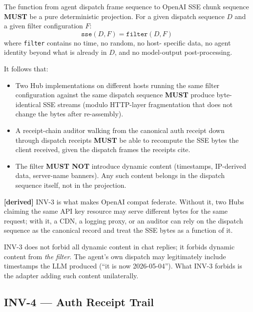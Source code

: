 \documentclass[11pt,a4paper]{article}
\newcommand{\derived}{\textcolor{derivedcolor}{\textbf{[derived]}}\xspace}
\theoremstyle{definition}
\begin{document}
\begin{invariant}
The function from agent dispatch frame sequence to OpenAI SSE
chunk sequence \textbf{MUST} be a pure deterministic projection.
For a given dispatch sequence \(D\) and a given filter
configuration \(F\):
\[
    \texttt{sse}(D, F) = \texttt{filter}(D, F)
\]
where \texttt{filter} contains no time, no random, no host-
specific data, no agent identity beyond what is already in
\(D\), and no model-output post-processing.

It follows that:
\begin{itemize}[leftmargin=2em,itemsep=0.1em]
    \item Two Hub implementations on different hosts running
    the same filter configuration against the same dispatch
    sequence \textbf{MUST} produce byte-identical SSE streams
    (modulo HTTP-layer fragmentation that does not change the
    bytes after re-assembly).
    \item A receipt-chain auditor walking from the canonical
    auth receipt down through dispatch receipts \textbf{MUST}
    be able to recompute the SSE bytes the client received,
    given the dispatch frames the receipts cite.
    \item The filter \textbf{MUST NOT} introduce dynamic content
    (timestamps, IP-derived data, server-name banners). Any such
    content belongs in the dispatch sequence itself, not in the
    projection.
\end{itemize}
\end{invariant}

\derived{} INV-3 is what makes OpenAI compat federate. Without
it, two Hubs claiming the same API key resource may serve
different bytes for the same request; with it, a CDN, a logging
proxy, or an auditor can rely on the dispatch sequence as the
canonical record and treat the SSE bytes as a function of it.

\begin{notebox}
INV-3 does not forbid all dynamic content in chat replies; it
forbids dynamic content from \emph{the filter}. The agent's own
dispatch may legitimately include timestamps the LLM produced
(``it is now 2026-05-04''). What INV-3 forbids is the adapter
adding such content unilaterally.
\end{notebox}

\subsection{INV-4 --- Auth Receipt Trail}
\end{document}
